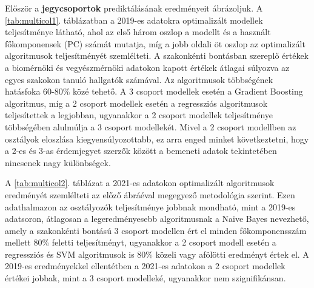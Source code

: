 \documentclass[12pt]{article}
\begin{document}
Először a \textbf{jegycsoportok} prediktálásának eredményeit ábrázoljuk. A \ref{tab:multicol1}. táblázatban a 2019-es adatokra optimalizált modellek teljesítménye látható, ahol az első három oszlop a modellt és a használt főkomponensek (PC) számát mutatja, míg a jobb oldali öt oszlop az optimalizált algoritmusok teljesítményét szemlélteti. A szakonkénti bontásban szereplő értékek a biomérnöki és vegyészmérnöki adatokon kapott értékek átlagai súlyozva az egyes szakokon tanuló hallgatók számával. Az algoritmusok többségének hatásfoka 60-80\% közé tehető. A 3 csoport modellek esetén a Gradient Boosting algoritmus, míg a 2 csoport modellek esetén a regressziós algoritmusok teljesítettek a legjobban, ugyanakkor a 2 csoport modellek teljesítménye többségében alulmúlja a 3 csoport modellekét. Mivel a 2 csoport modellben az osztályok eloszlása kiegyensúlyozottabb, ez arra enged minket következtetni, hogy a 2-es és 3-as érdemjegyet szerzők között a bemeneti adatok tekintetében nincsenek nagy különbségek.

A \ref{tab:multicol2}. táblázat a 2021-es adatokon optimalizált algoritmusok eredményét szemlélteti az előző ábráéval megegyező metodológia szerint. Ezen adathalmazon az osztályozók teljesítménye jobbnak mondható, mint a 2019-es adatsoron, átlagosan a legeredményesebb algoritmusnak a Naive Bayes nevezhető, amely a szakonkénti bontású 3 csoport modellen ért el minden főkomponensszám mellett 80\% feletti teljesítményt, ugyanakkor a 2 csoport modell esetén a regressziós és SVM algoritmusok is 80\% közeli vagy afölötti eredményt értek el. A 2019-es eredményekkel ellentétben a 2021-es adatokon a 2 csoport modellek értékei jobbak, mint a 3 csoport modelleké, ugyanakkor nem szignifikánsan.
\end{document}
